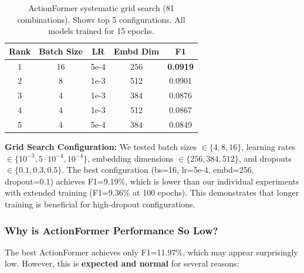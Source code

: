 \documentclass[10pt,twocolumn,letterpaper]{article}
\begin{document}
\begin{table}[h]
\centering
\caption{ActionFormer systematic grid search (81 combinations). Shows top 5 configurations. All models trained for 15 epochs.}
\label{tab:actionformer_grid}
\begin{tabular}{ccccc}
\toprule
Rank & Batch Size & LR & Embd Dim & F1 \\
\midrule
1 & 16 & 5e-4 & 256 & \textbf{0.0919} \\
2 & 8 & 1e-3 & 512 & 0.0901 \\
3 & 4 & 1e-3 & 384 & 0.0876 \\
4 & 4 & 1e-3 & 512 & 0.0867 \\
5 & 4 & 5e-4 & 384 & 0.0849 \\
\bottomrule
\end{tabular}
\end{table}

\textbf{Grid Search Configuration:} We tested batch sizes $\in \{4, 8, 16\}$, learning rates $\in \{10^{-3}, 5\cdot10^{-4}, 10^{-4}\}$, embedding dimensions $\in \{256, 384, 512\}$, and dropouts $\in \{0.1, 0.3, 0.5\}$. The best configuration (bs=16, lr=5e-4, embd=256, dropout=0.1) achieves F1=9.19\%, which is lower than our individual experiments with extended training (F1=9.36\% at 100 epochs). This demonstrates that longer training is beneficial for high-dropout configurations.

\subsubsection{Why is ActionFormer Performance So Low?}

The best ActionFormer achieves only F1=11.97\%, which may appear surprisingly low. However, this is \textbf{expected and normal} for several reasons:
\end{document}

